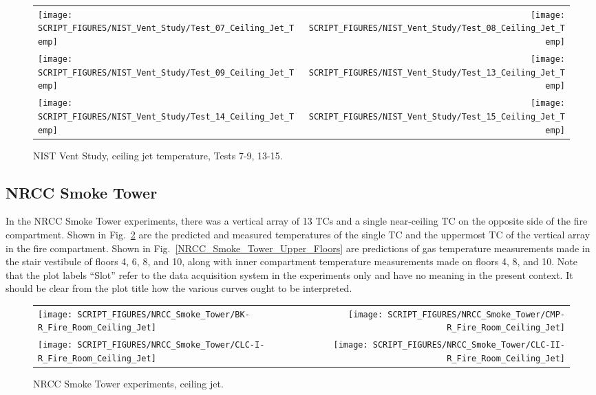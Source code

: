 \begin{figure}[!h]
\begin{tabular*}{\textwidth}{l@{\extracolsep{\fill}}r}
\texttt{[image: SCRIPT\_FIGURES/NIST\_Vent\_Study/Test\_07\_Ceiling\_Jet\_Temp]} &
\texttt{[image: SCRIPT\_FIGURES/NIST\_Vent\_Study/Test\_08\_Ceiling\_Jet\_Temp]} \\
\texttt{[image: SCRIPT\_FIGURES/NIST\_Vent\_Study/Test\_09\_Ceiling\_Jet\_Temp]} &
\texttt{[image: SCRIPT\_FIGURES/NIST\_Vent\_Study/Test\_13\_Ceiling\_Jet\_Temp]} \\
\texttt{[image: SCRIPT\_FIGURES/NIST\_Vent\_Study/Test\_14\_Ceiling\_Jet\_Temp]} &
\texttt{[image: SCRIPT\_FIGURES/NIST\_Vent\_Study/Test\_15\_Ceiling\_Jet\_Temp]}
\end{tabular*}
\caption[NIST Vent Study, ceiling jet temperature, Tests 7-9, 13-15]
{NIST Vent Study, ceiling jet temperature, Tests 7-9, 13-15.}
\label{NIST_Vent_Study_Ceiling_Jet_2}
\end{figure}


\clearpage

\subsection{NRCC Smoke Tower}

In the NRCC Smoke Tower experiments, there was a vertical array of 13 TCs and a single near-ceiling TC on the opposite side of the fire compartment. Shown in Fig.~\ref{NRCC_Smoke_Tower_Ceiling_Jet} are the predicted and measured temperatures of the single TC and the uppermost TC of the vertical array in the fire compartment. Shown in Fig.~\ref{NRCC_Smoke_Tower_Upper_Floors} are predictions of gas temperature measurements made in the stair vestibule of floors 4, 6, 8, and 10, along with inner compartment temperature measurements made on floors 4, 8, and 10. Note that the plot labels ``Slot'' refer to the data acquisition system in the experiments only and have no meaning in the present context. It should be clear from the plot title how the various curves ought to be interpreted.


\begin{figure}[!ht]
\begin{tabular*}{\textwidth}{l@{\extracolsep{\fill}}r}
\texttt{[image: SCRIPT\_FIGURES/NRCC\_Smoke\_Tower/BK-R\_Fire\_Room\_Ceiling\_Jet]} &
\texttt{[image: SCRIPT\_FIGURES/NRCC\_Smoke\_Tower/CMP-R\_Fire\_Room\_Ceiling\_Jet]} \\
\texttt{[image: SCRIPT\_FIGURES/NRCC\_Smoke\_Tower/CLC-I-R\_Fire\_Room\_Ceiling\_Jet]} &
\texttt{[image: SCRIPT\_FIGURES/NRCC\_Smoke\_Tower/CLC-II-R\_Fire\_Room\_Ceiling\_Jet]}
\end{tabular*}
\caption{NRCC Smoke Tower experiments, ceiling jet.}
\label{NRCC_Smoke_Tower_Ceiling_Jet}
\end{figure}

